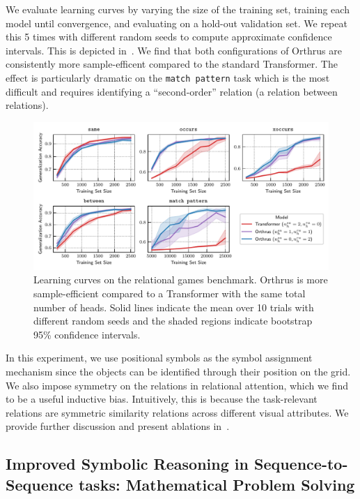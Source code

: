 We evaluate learning curves by varying the size of the training set, training each model until convergence, and evaluating on a hold-out validation set. We repeat this 5 times with different random seeds to compute approximate confidence intervals. This is depicted in~. We find that both configurations of Orthrus are consistently more sample-efficent compared to the standard Transformer. The effect is particularly dramatic on the \texttt{match pattern} task which is the most difficult and requires identifying a ``second-order'' relation (a relation between relations).

\begin{figure}
    \includegraphics[width=\textwidth]{figs/experiments/relgames/relgames_learning_curves.pdf}
    \caption{Learning curves on the relational games benchmark. Orthrus is more sample-efficient compared to a Transformer with the same total number of heads. Solid lines indicate the mean over 10 trials with different random seeds and the shaded regions indicate bootstrap 95\% confidence intervals.}\label{fig:relgames_learning_curves}
\end{figure}

In this experiment, we use positional symbols as the symbol assignment mechanism since the objects can be identified through their position on the grid. We also impose symmetry on the relations in relational attention, which we find to be a useful inductive bias. Intuitively, this is because the task-relevant relations are symmetric similarity relations across different visual attributes. We provide further discussion and present ablations in~.

\subsection{Improved Symbolic Reasoning in Sequence-to-Sequence tasks: Mathematical Problem Solving}\label{ssec:math}

